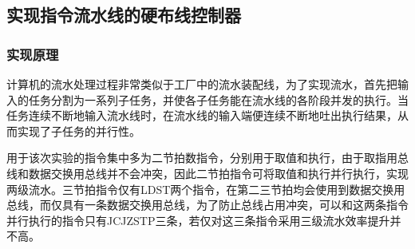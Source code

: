 \subsection{实现指令流水线的硬布线控制器}
\subsubsection{实现原理}
\par
计算机的流水处理过程非常类似于工厂中的流水装配线，为了实现流水，首先把输入的任务分割为一系列子任务，并使各子任务能在流水线的各阶段并发的执行。当任务连续不断地输入流水线时，在流水线的输入端便连续不断地吐出执行结果，从而实现了子任务的并行性。
\par
用于该次实验的指令集中多为二节拍数指令，分别用于取值和执行，由于\tec 取指用总线和数据交换用总线并不会冲突，因此二节拍指令可将取值和执行并行执行，实现两级流水。三节拍指令仅有LD\comma ST两个指令，在第二三节拍均会使用到数据交换用总线，而\tec 仅具有一条数据交换用总线，为了防止总线占用冲突，可以和这两条指令并行执行的指令只有JC\comma JZ\comma STP三条，若仅对这三条指令采用三级流水效率提升并不高。
